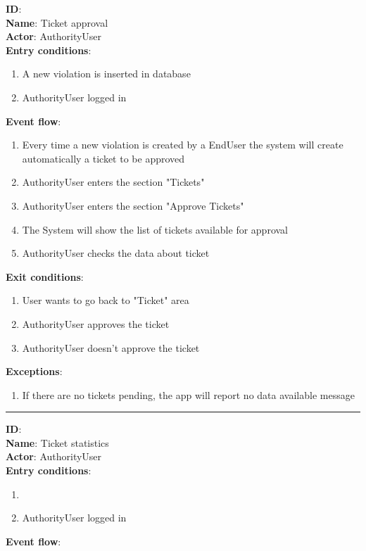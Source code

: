 \begin{enumerate}
\begin{itemize}
		\textbf{ID}:  \\
		\textbf{Name}: Ticket approval  \\
		\textbf{Actor}: AuthorityUser   \\
		\textbf{Entry conditions}:
		\begin{enumerate}
			\item{A new violation is inserted in database}
      \item{AuthorityUser logged in}
		\end{enumerate}
		\textbf{Event flow}:
		\begin{enumerate}
      \item{Every time a new violation is created by a EndUser the system will create automatically a ticket to be approved}
			\item{AuthorityUser enters the section "Tickets"}
			\item{AuthorityUser enters the section "Approve Tickets"}
      \item{The System will show the list of tickets available for approval }
      \item{AuthorityUser checks the data about ticket}
		\end{enumerate}
		\textbf{Exit conditions}:
    \begin{enumerate}
      \item{User wants to go back to "Ticket" area}
      \item{AuthorityUser approves the ticket}
      \item{AuthorityUser doesn't approve the ticket}
    \end{enumerate}
		\textbf{Exceptions}:
		\begin{enumerate}
			\item{If there are no tickets pending, the app will report no data available message}
		\end{enumerate}
		\rule{\linewidth}{0.4pt}

    \textbf{ID}:  \\
    \textbf{Name}: Ticket statistics  \\
    \textbf{Actor}: AuthorityUser   \\
    \textbf{Entry conditions}:
    \begin{enumerate}
      \item{}
      \item{AuthorityUser logged in}
    \end{enumerate}
    \textbf{Event flow}:
    \begin{enumerate}


\end{enumerate}
\end{itemize}
\end{enumerate}
